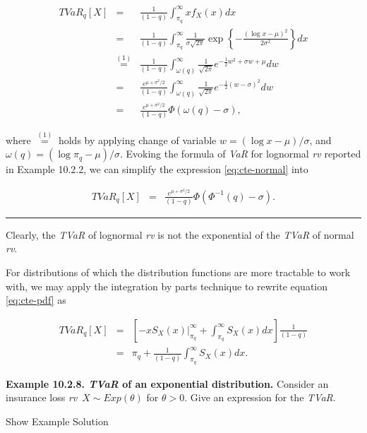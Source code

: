 \documentclass[]{book}
\theoremstyle{definition}
\theoremstyle{definition}
\theoremstyle{definition}
\theoremstyle{remark}
\begin{document}
\begin{eqnarray}
  TVaR_q[X] &=& \frac{1}{(1-q)} \int_{\pi_q}^{\infty} x f_X(x)dx \nonumber\\
&=&\frac{1}{(1-q)} \int_{\pi_q}^{\infty} \frac{1}{\sigma \sqrt{2\pi}} \exp\left\{ -\frac{(\log x-\mu)^2}{2\sigma^2}
\right\}dx\nonumber\\
&\overset{(1)}{=}&\frac{1}{(1-q)} \int_{\omega(q)}^{\infty} \frac{1}{\sqrt{2\pi}} e^{ -\frac{1}{2}w^2+\sigma w+\mu}dw\nonumber\\
&=&\frac{e^{\mu+\sigma^2/2}}{(1-q)} \int_{\omega(q)}^{\infty} \frac{1}{\sqrt{2\pi}} e^{ -\frac{1}{2}(w-\sigma)^2}dw\nonumber\\
&=&\frac{e^{\mu+\sigma^2/2}}{(1-q)} \Phi(\omega(q)-\sigma),
\label{eq:cte-normal}
\end{eqnarray}

where \(\overset{(1)}{=}\) holds by applying change of variable
\(w=(\log x-\mu)/\sigma\), and \(\omega(q)=(\log \pi_q-\mu)/\sigma\).
Evoking the formula of \emph{VaR} for lognormal \emph{rv} reported in
Example 10.2.2, we can simplify the expression \eqref{eq:cte-normal} into

\begin{eqnarray*}
  TVaR_q[X] &=& \frac{e^{\mu+\sigma^2/2}}{(1-q)} \Phi(\Phi^{-1}(q)-\sigma).
\end{eqnarray*}

\begin{center}\rule{0.5\linewidth}{\linethickness}\end{center}

Clearly, the \emph{TVaR} of lognormal \emph{rv} is not the exponential
of the \emph{TVaR} of normal \emph{rv}.

For distributions of which the distribution functions are more tractable
to work with, we may apply the integration by parts technique to rewrite
equation \eqref{eq:cte-pdf} as

\begin{eqnarray*}
TVaR_{q}[X]&=&\left[-x S_X(x)\big |_{\pi_q}^{\infty}+\int_{\pi_q}^{\infty}S_X(x)dx\right]\frac{1}{(1-q)}\\
&=& \pi_q +\frac{1}{(1-q)}\int_{\pi_q}^{\infty}S_X(x)dx.
\end{eqnarray*}

\textbf{Example 10.2.8. \emph{TVaR} of an exponential distribution.}
Consider an insurance loss \emph{rv}~\(X\sim Exp(\theta)\) for
\(\theta>0\). Give an expression for the \emph{TVaR}.

Show Example Solution
\end{document}
